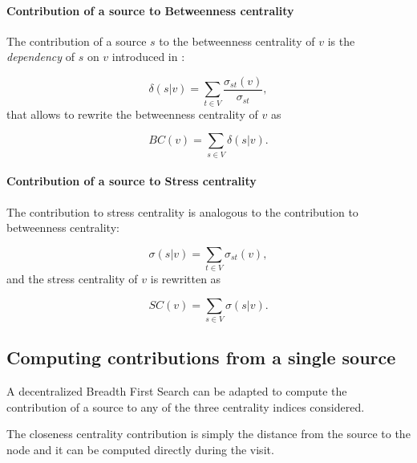 \paragraph{Contribution of a source to Betweenness centrality}
The contribution of a source $s$ to the betweenness centrality of $v$ is the \emph{dependency} of $s$ on $v$ introduced in \cite{brandes2001}:

\begin{equation}
\delta(s|v) = \sum_{t \in V} \frac{\sigma_{st}(v)}{\sigma_{st}},
\end{equation}
that allows to rewrite the betweenness centrality of $v$ as

\begin{equation}
BC(v) = \sum_{s \in V} \delta(s|v).
\end{equation}

\paragraph{Contribution of a source to Stress centrality}
The contribution to stress centrality is analogous to the contribution to betweenness centrality:

\begin{equation} \label{eq:contrib:sc}
\sigma(s|v) = \sum_{t \in V} \sigma_{st}(v),
\end{equation}
and the stress centrality of $v$ is rewritten as

\begin{equation}
SC(v) = \sum_{s \in V} \sigma(s|v).
\end{equation}

\subsection{Computing contributions from a single source}
\label{sec:recursive}

A decentralized Breadth First Search can be adapted to compute the contribution of a source to any of the three centrality indices considered.

The closeness centrality contribution is simply the distance from the source to the node and it can be computed directly during the visit.

